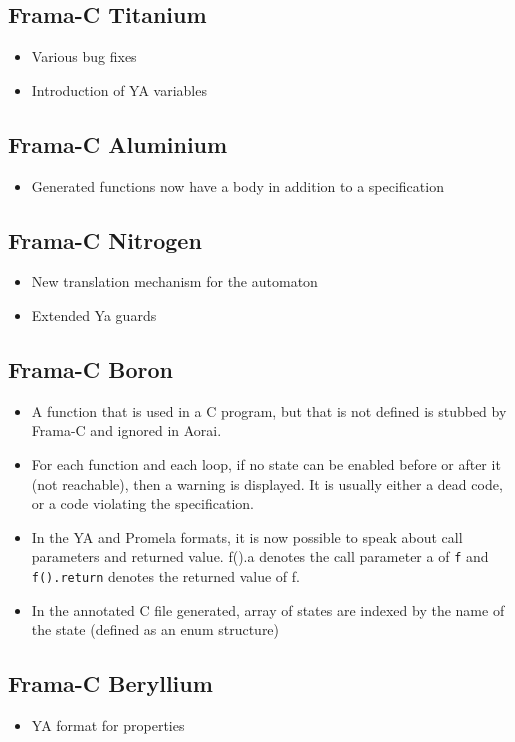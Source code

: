 \documentclass{report}
\begin{document}
\subsection{Frama-C Titanium}
\begin{itemize}
\item Various bug fixes
\item Introduction of YA variables
\end{itemize}
\subsection{Frama-C Aluminium}
\begin{itemize}
\item Generated functions now have a body in addition to a specification
\end{itemize}
\subsection{Frama-C Nitrogen}
\begin{itemize}
\item New translation mechanism for the automaton
\item Extended Ya guards
\end{itemize}

\subsection{Frama-C Boron}
\lstset{language=ya}
\begin{itemize}
\item A function that is used in a C program, but that is not defined
  is stubbed by Frama-C and ignored in Aorai.
\item For each function and each loop, if no state can be enabled
  before or after it (not reachable), then a warning is displayed. It
  is usually either a dead code, or a code violating the
  specification.
\item In the YA and Promela formats, it is now possible to speak about
  call parameters and returned value. f().a denotes the call parameter
  a of \lstinline|f| and 
  \lstinline|f().return| denotes the returned value of f.
\item In the annotated C file generated, array of states are indexed
  by the name of the state (defined as an enum structure)
\end{itemize}

\subsection{Frama-C Beryllium}
\begin{itemize}
  \item YA format for properties
\end{itemize}
\end{document}
